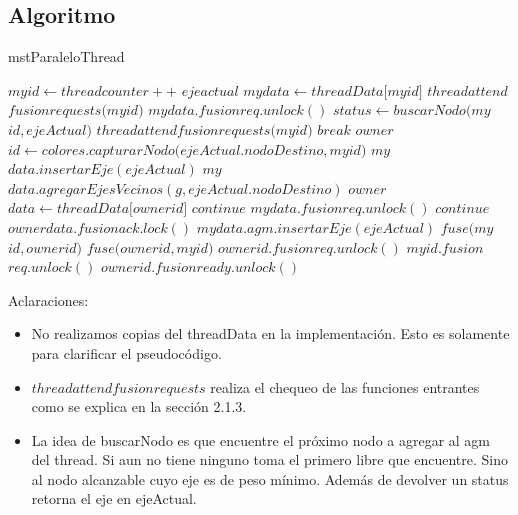 \subsection{Algoritmo}
\begin{algorithm}
\begin{algorithmic}
\caption{mstParaleloThread}

\STATE $my$\textunderscore$id \gets thread$\textunderscore$counter++ $
\STATE $eje$\textunderscore$actual$
\STATE $my$\textunderscore$data \gets threadData[my$\textunderscore$id]$
\STATE $thread$\textunderscore$attend$\textunderscore$fusion$\textunderscore$requests(my$\textunderscore$id)$
\STATE $my$\textunderscore$data.fusion$\textunderscore$req.unlock()$
\STATE $status \gets buscarNodo(my$\textunderscore$id,ejeActual)$
\STATE $thread$\textunderscore$attend$\textunderscore$fusion$\textunderscore$requests(my$\textunderscore$id)$
\ENDIF
{}
\STATE $break$
\ENDIF
\STATE $owner$\textunderscore$id \gets colores.capturarNodo(ejeActual.nodoDestino,my$\textunderscore$id)$
\STATE $my$\textunderscore$data.insertarEje(ejeActual)$
\STATE $my$\textunderscore$data.agregarEjesVecinos(g,ejeActual.nodoDestino)$
\ELSE 
\STATE $owner$\textunderscore$data \gets threadData[owner$\textunderscore$id]$
\STATE $continue$
\ENDIF
{}
\STATE $my$\textunderscore$data.fusion$\textunderscore$req.unlock()$
\STATE $continue$
\ENDIF
\STATE $owner$\textunderscore$data.fusion$\textunderscore$ack.lock()$
\STATE $my$\textunderscore$data.agm.insertarEje(ejeActual)$
\STATE $fuse(my$\textunderscore$id,owner$\textunderscore$id)$
\ELSE
\STATE $fuse(owner$\textunderscore$id,my$\textunderscore$id)$
\ENDIF
\ENDIF
\ENDIF
\STATE $owner$\textunderscore$id.fusion$\textunderscore$req.unlock()$
\STATE $my$\textunderscore$id.fusion$\textunderscore$req.unlock()$
\STATE $owner$\textunderscore$id.fusion$\textunderscore$ready.unlock()$
\ENDWHILE
\end{algorithmic}
\end{algorithm}


\newpage
Aclaraciones:

\begin{itemize}
    \item No realizamos copias del threadData en la implementación. Esto es solamente para clarificar el pseudocódigo.
    \item $thread$\textunderscore$attend$\textunderscore$fusion$\textunderscore$requests$ realiza el chequeo de las funciones entrantes como se explica en la sección 2.1.3.
    \item La idea de buscarNodo es que encuentre el próximo nodo a agregar al agm del thread. Si aun no tiene ninguno toma el primero libre que encuentre. Sino al nodo alcanzable cuyo eje es de peso mínimo. Además de devolver un status retorna el eje en ejeActual.
\end{itemize}
